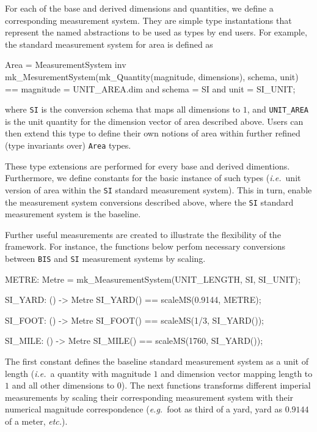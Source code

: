 \documentclass[runningheads,a4paper]{llncs}
\begin{document}
For each of the base and derived dimensions and quantities, we define a corresponding measurement system. They are simple type instantations that represent the named abstractions to be used as types by end users. For example, the standard measurement system for area is defined as 
%
\begin{vdmsl}[frame=none,basicstyle=\ttfamily\scriptsize]
  Area = MeasurementSystem
  inv mk_MesurementSystem(mk_Quantity(magnitude, dimensions), schema, unit) == 
          magnitude = UNIT_AREA.dim and schema = SI and unit = SI_UNIT;
\end{vdmsl}
%
\noindent where \texttt{SI} is the conversion schema that maps all dimensions to \(1\), and \texttt{UNIT\_AREA} is the unit quantity for the dimension vector of area described above. Users can then extend this type to define their own notions of area within further refined (type invariants over) \texttt{Area} types.

These type extensions are performed for every base and derived dimentions. Furthermore, we define constants for the basic instance of such types (\textit{i.e.}~unit version of area within the \texttt{SI} standard measurement system). This in turn, enable the measurement system conversions described above, where the \texttt{SI} standard measurement system is the baseline.   

Further useful measurements are created to illustrate the flexibility of the framework. For instance, the functions below perfom necessary conversions between \texttt{BIS} and \texttt{SI} measurement systems by scaling.   
%
\begin{vdmsl}[frame=none,basicstyle=\ttfamily\scriptsize]
    METRE: Metre = mk_MeasurementSystem(UNIT_LENGTH, SI, SI_UNIT);

    SI_YARD: () -> Metre
    SI_YARD() == scaleMS(0.9144, METRE);

    SI_FOOT: () -> Metre
    SI_FOOT() == scaleMS(1/3, SI_YARD());

    SI_MILE: () -> Metre
    SI_MILE() == scaleMS(1760, SI_YARD());
\end{vdmsl}
%
\noindent The first constant defines the baseline standard measurement system as a unit of length (\textit{i.e.}~a quantity with magnitude \(1\) and dimension vector mapping length to \(1\) and all other dimensions to \(0\)). The next functions transforms different imperial measurements by scaling their corresponding measurement system with their numerical magnitude correspondence (\textit{e.g.}~foot as third of a yard, yard as \(0.9144\) of a meter, \textit{etc.}). 
\end{document}
